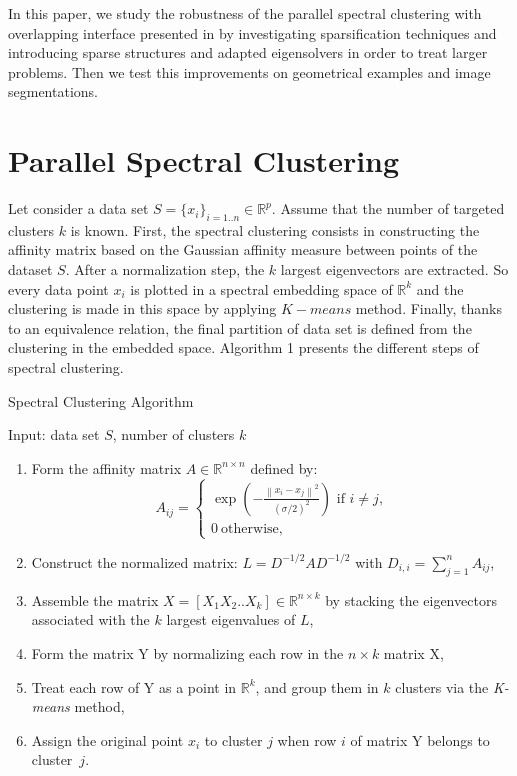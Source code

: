 \documentclass{llncs}
\begin{document}
In this paper, we study the robustness of the parallel spectral clustering with overlapping interface presented in  \cite{mouysset3} by
investigating sparsification techniques and introducing sparse structures and
adapted eigensolvers in order to treat larger problems. Then we test this improvements on geometrical examples and image segmentations.


\section{Parallel Spectral Clustering}
%

Let consider a data set $S=\{x_i\}_{i=1..n}\in \mathbb{R}^p$. Assume that the
number of targeted clusters $k$ is known. First, the spectral clustering
consists in constructing the affinity matrix based on the Gaussian affinity
measure between points of the dataset $S$.
After a normalization step, the $k$ largest eigenvectors are extracted. So
every data point $x_i$ is plotted in a spectral embedding space of
$\mathbb{R}^k$ and the clustering is made in this space by applying $K-means$
method. Finally, thanks to an equivalence relation, the final partition of
data set is defined from the clustering in the embedded space. Algorithm 1
presents the different steps of spectral clustering.
\begin{algorithm}
\caption{Spectral Clustering Algorithm}
Input: data set $S$, number of clusters $k$
\begin{enumerate}
\item Form the affinity matrix $A\in\mathbb{R}^{n\times n}$ defined by:
\begin{equation}
A_{ij}=\begin{cases}
\exp\left(-\frac{\left\|x_i-x_j\right\|^2}{(\sigma/2)^2}\right) \text{\  if $i\neq j$,}\\ \label{defaff}
0 \ \text{otherwise,}
\end{cases}
\end{equation}
\item Construct the normalized matrix: $L=D^{-1/2}AD^{-1/2}$ with $D_{i,i}=\sum_{j=1}^n A_{ij}$,
\item Assemble the matrix $X=[X_1X_2..X_k]\in \mathbb{R}^{n\times k}$ by stacking the eigenvectors associated with the {$k$} largest eigenvalues of $L$,
\item Form the matrix Y by normalizing each row in the $n \times k$ matrix X,
\item Treat each row of Y as a point in $\mathbb{R}^{k}$, and group them in $k$ clusters via the {\it K-means} method,
\item Assign the original point $x_i$ to cluster $j$ when row $i$ of matrix Y belongs to cluster~$j$. 
\end{enumerate}
\label{algo}
\end{algorithm}
\end{document}
